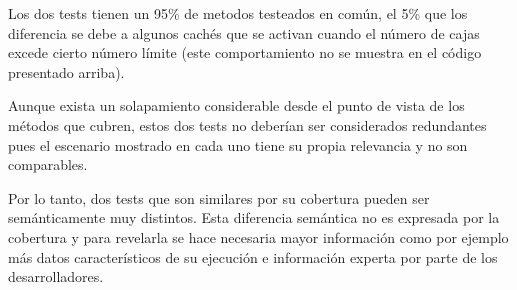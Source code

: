 \par Los dos tests tienen un 95\% de metodos testeados en común, el 5\% que los diferencia se debe a algunos cachés que se activan cuando el número de cajas excede cierto número límite (este comportamiento no se muestra en el código presentado arriba). 

\par Aunque exista un solapamiento considerable desde el punto de vista de los métodos que cubren, estos dos tests no deberían ser considerados redundantes pues el escenario mostrado en cada uno tiene su propia relevancia y no son comparables. 

\par Por lo tanto, dos tests que son similares por su cobertura pueden ser semánticamente muy distintos. Esta diferencia semántica no es expresada por la cobertura y para revelarla se hace necesaria mayor información como por ejemplo más datos característicos de su ejecución e información experta por parte de los desarrolladores. 
